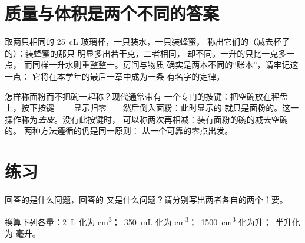 \section{质量与体积是两个不同的答案}

\begin{example}\label{ex:g6:mass-and-volume:different}
取两只相同的 \qty{25}{cL} 玻璃杯，一只装水，一只装蜂蜜，
称出它们的（减去杯子的）：装蜂蜜的那只
明显多出若干克，二者相同，
却不同。一升的只比一克多一点，
而同样一升水则重整整一。房间与物质
确实是两本不同的“账本”，请牢记这一点：
它将在本学年的最后一章中成为一条
有名字的定律。
\end{example}

\begin{remark}[如何单独称出容器中的物料]\label{rem:g6:mass-and-volume:tare}
怎样称面粉而不把碗一起称？现代通常带有
一个专门的按键：把空碗放在秤盘上，按下按键——
显示归零——然后倒入面粉：此时显示的
就只是面粉的。这一操作称为\emph{去皮}。没有此按键时，
可以称两次再相减：装有面粉的碗的减去空碗的。
两种方法遵循的仍是同一原则：
从一个可靠的零点出发。
\end{remark}

\section{练习}

\begin{exercise}[$\star$]\label{exo:g6:mass-and-volume:1}
回答的是什么问题，回答的
又是什么问题？请分别写出两者各自的两个主要。
\end{exercise}

\begin{exercise}[$\star$]\label{exo:g6:mass-and-volume:2}
换算下列各量：\qty{2}{L} 化为 \unit{cm^3}；\ \qty{350}{mL} 化为
\unit{cm^3}；\ \qty{1500}{cm^3} 化为升；\ 半升化为
毫升。
\end{exercise}

